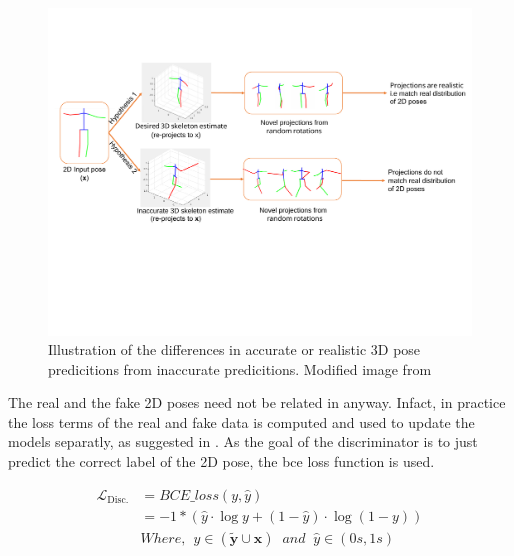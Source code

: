 \begin{figure}[h]
    \centering
    \includegraphics[width=\textwidth]{figures/h36_viz/novel_view_contraint.pdf}
    \caption{Illustration of the differences in accurate or realistic 3D pose predicitions from inaccurate predicitions. Modified image from \cite{can3dpose}}
    \label{fig:novel_view_constraint}
\end{figure}

The real and the fake 2D poses need not be related in anyway. Infact, in practice the loss terms of the real and fake data is computed and used to update the models separatly, as suggested in \cite{soumith2017wasserstein, goodfellow2014generative}. As the goal of the discriminator is to just predict the correct label of the 2D pose, the \ac{bce} loss function is used. 

\begin{equation} \label{loss_bce}
    \begin{split}
        \mathcal{L}_{\text {Disc.}} & = BCE\_loss(y, \hat{y}) \\
        & = -1 * (\hat{y} \cdot \log y + (1 - \hat{y}) \cdot \log (1 - y)) \\
        & Where, \:\: y \in (\tilde{\textbf{y}} \cup \textbf{x}) \;\; and \;\; \hat{y} \in (0s, 1s)
    \end{split}
\end{equation}

